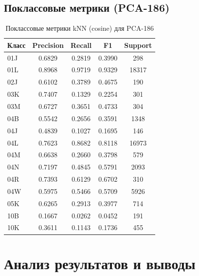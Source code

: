 \documentclass{article}
\begin{document}
\subsection{Поклассовые метрики (PCA-186)}
\begin{table}[h]
\centering
\caption{Поклассовые метрики kNN (cosine) для PCA-186}
\scriptsize
\begin{tabular}{lcccc}
\toprule
\textbf{Класс} & \textbf{Precision} & \textbf{Recall} & \textbf{F1} & \textbf{Support} \\
\midrule
01J & 0.6829 & 0.2819 & 0.3990 & 298 \\
01L & 0.8968 & 0.9719 & 0.9329 & 18317 \\
02J & 0.6102 & 0.3789 & 0.4675 & 190 \\
03K & 0.7407 & 0.1329 & 0.2254 & 301 \\
03M & 0.6727 & 0.3651 & 0.4733 & 304 \\
04B & 0.5542 & 0.2656 & 0.3591 & 1348 \\
04J & 0.4839 & 0.1027 & 0.1695 & 146 \\
04L & 0.7623 & 0.8682 & 0.8118 & 16973 \\
04M & 0.6638 & 0.2660 & 0.3798 & 579 \\
04N & 0.7197 & 0.4845 & 0.5791 & 2093 \\
04R & 0.7393 & 0.6129 & 0.6702 & 310 \\
04W & 0.5975 & 0.5466 & 0.5709 & 5926 \\
05K & 0.6265 & 0.2913 & 0.3977 & 714 \\
10B & 0.1667 & 0.0262 & 0.0452 & 191 \\
10K & 0.3611 & 0.1143 & 0.1736 & 455 \\
\bottomrule
\end{tabular}
\end{table}

\newpage
\section{Анализ результатов и выводы}
\end{document}
